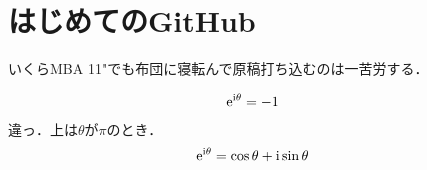 \documentclass[b5j,fleqn]{jsarticle}
\begin{document}
\section{はじめてのGitHub}
いくらMBA 11"でも布団に寝転んで原稿打ち込むのは一苦労する．

\begin{align}
   \rm{e}^{\rm{i}\theta} &= -1
\end{align}
違っ．上は$\theta$が$\pi$のとき．
\begin{align}
   \rm{e}^{\rm{i}\theta} &= \cos{\theta} + \rm{i}\sin{\theta}
\end{align}
\end{document}
